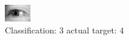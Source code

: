 \begin{figure}[h!]
\begin{center}
\includegraphics[width=0.60\columnwidth]{figures/ID3212_class_3_target_4.png}
\end{center}
\caption{ Classification: 3 actual target: 4}
\label{fig:ID3212_class_3_target_4}
\end{figure}
